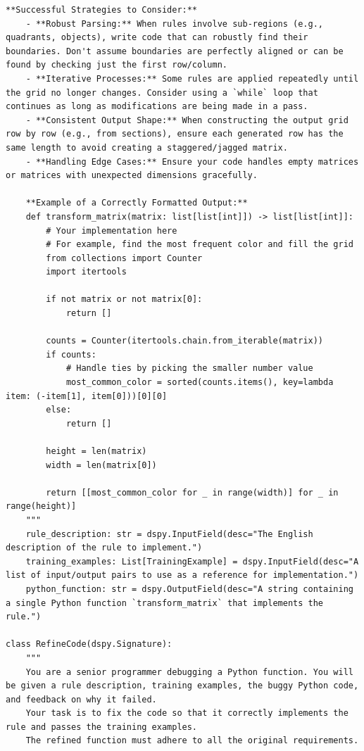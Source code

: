 \begin{instructbox}
\begin{lstlisting}[breakindent=0pt, breaklines=true, breakatwhitespace=true, frame=single, backgroundcolor=\color{blue!10}]
    **Successful Strategies to Consider:**
    - **Robust Parsing:** When rules involve sub-regions (e.g., quadrants, objects), write code that can robustly find their boundaries. Don't assume boundaries are perfectly aligned or can be found by checking just the first row/column.
    - **Iterative Processes:** Some rules are applied repeatedly until the grid no longer changes. Consider using a `while` loop that continues as long as modifications are being made in a pass.
    - **Consistent Output Shape:** When constructing the output grid row by row (e.g., from sections), ensure each generated row has the same length to avoid creating a staggered/jagged matrix.
    - **Handling Edge Cases:** Ensure your code handles empty matrices or matrices with unexpected dimensions gracefully.

    **Example of a Correctly Formatted Output:**
    def transform_matrix(matrix: list[list[int]]) -> list[list[int]]:
        # Your implementation here
        # For example, find the most frequent color and fill the grid
        from collections import Counter
        import itertools
        
        if not matrix or not matrix[0]:
            return []
            
        counts = Counter(itertools.chain.from_iterable(matrix))
        if counts:
            # Handle ties by picking the smaller number value
            most_common_color = sorted(counts.items(), key=lambda item: (-item[1], item[0]))[0][0]
        else:
            return []

        height = len(matrix)
        width = len(matrix[0])
        
        return [[most_common_color for _ in range(width)] for _ in range(height)]
    """
    rule_description: str = dspy.InputField(desc="The English description of the rule to implement.")
    training_examples: List[TrainingExample] = dspy.InputField(desc="A list of input/output pairs to use as a reference for implementation.")
    python_function: str = dspy.OutputField(desc="A string containing a single Python function `transform_matrix` that implements the rule.")

class RefineCode(dspy.Signature):
    """
    You are a senior programmer debugging a Python function. You will be given a rule description, training examples, the buggy Python code, and feedback on why it failed.
    Your task is to fix the code so that it correctly implements the rule and passes the training examples.
    The refined function must adhere to all the original requirements.


\end{lstlisting}
\end{instructbox}
